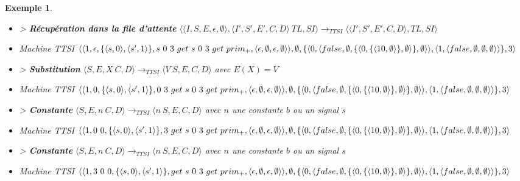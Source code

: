 \documentclass[10pt,a4paper]{report}
\newtheorem{ex}{Exemple}
\begin{document}
\begin{ex}
\begin{itemize}
			\item[] > \textbf{Récupération dans la file d'attente} $\langle\langle I,S,E,\epsilon,\emptyset\rangle,\langle I',S',E',C,D\rangle~TL,SI\rangle 
			\longrightarrow_{TTSI} 
			\langle\langle I',S',E',C,D\rangle,TL,SI\rangle$
			\item[] Machine TTSI $\langle\langle 1,\epsilon,\{\langle s,0\rangle,\langle s',1\rangle\},s~0~3~get~s~0~3~get~prim_{+} ,\langle\epsilon,\emptyset,\epsilon,\emptyset\rangle\rangle,\emptyset,\{\langle 0,\langle false,\emptyset,\{\langle 0,\{\langle 10,\emptyset\rangle\},\emptyset\rangle\},\emptyset\rangle\rangle,\\\langle 1,\langle false,\emptyset,\emptyset,\emptyset\rangle\rangle\},3\rangle$ 
			\item[] > \textbf{Substitution} $\langle S,E,X~C,D\rangle
			\longrightarrow_{TTSI} 
			\langle V~S,E,C,D\rangle$ avec $E(X) = V$
			\item[] Machine TTSI $\langle\langle 1,0,\{\langle s,0\rangle,\langle s',1\rangle\},0~3~get~s~0~3~get~prim_{+} ,\langle\epsilon,\emptyset,\epsilon,\emptyset\rangle\rangle,\emptyset,\{\langle 0,\langle false,\emptyset,\{\langle 0,\{\langle 10,\emptyset\rangle\},\emptyset\rangle\},\emptyset\rangle\rangle,\\\langle 1,\langle false,\emptyset,\emptyset,\emptyset\rangle\rangle\},3\rangle$ 
			\item[] > \textbf{Constante} $\langle S,E,n~C,D\rangle 
			\longrightarrow_{TTSI} 
			\langle n~S,E,C,D\rangle$ avec $n$ une constante $b$ ou un signal $s$
			\item[] Machine TTSI $\langle\langle 1,0~0,\{\langle s,0\rangle,\langle s',1\rangle\},3~get~s~0~3~get~prim_{+} ,\langle\epsilon,\emptyset,\epsilon,\emptyset\rangle\rangle,\emptyset,\{\langle 0,\langle false,\emptyset,\{\langle 0,\{\langle 10,\emptyset\rangle\},\emptyset\rangle\},\emptyset\rangle\rangle,\\\langle 1,\langle false,\emptyset,\emptyset,\emptyset\rangle\rangle\},3\rangle$ 
			\item[] > \textbf{Constante} $\langle S,E,n~C,D\rangle 
			\longrightarrow_{TTSI} 
			\langle n~S,E,C,D\rangle$ avec $n$ une constante $b$ ou un signal $s$
			\item[] Machine TTSI $\langle\langle 1,3~0~0,\{\langle s,0\rangle,\langle s',1\rangle\},get~s~0~3~get~prim_{+} ,\langle\epsilon,\emptyset,\epsilon,\emptyset\rangle\rangle,\emptyset,\{\langle 0,\langle false,\emptyset,\{\langle 0,\{\langle 10,\emptyset\rangle\},\emptyset\rangle\},\emptyset\rangle\rangle,\\\langle 1,\langle false,\emptyset,\emptyset,\emptyset\rangle\rangle\},3\rangle$ 

\end{itemize}
\end{ex}
\end{document}
